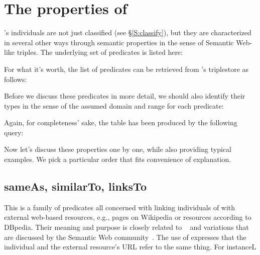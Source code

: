
\section{The properties of \solasote}
\label{S:properties}

\solasote's individuals are not just classified (see
\S\ref{S:classify}), but they are characterized in several other ways
through semantic properties in the sense of Semantic Web-like
triples. The underlying set of predicates is listed here:


\noindent
For what it's worth, the list of predicates can be retrieved from
\solasote's triplestore as follows:


\noindent
Before we discuss these predicates in more detail, we should also
identify their types in the sense of the assumed domain and range for
each predicate:


\noindent
Again, for completeness' sake, the table has been produced by the
following query:


\noindent
Now let's discuss these properties one by one, while also providing
typical examples. We pick a particular order that fits convenience of
explanation.


\subsection{sameAs, similarTo, linksTo} 

This is a family of predicates all concerned with linking individuals
of \solasote{} with external web-based resources, e.g., pages on
Wikipedia or resources according to DBpedia. Their meaning and purpose
is closely related to ~\cite{owl} and variations that
are discussed by the Semantic Web community~\cite{HalpinHT11}. The use
of  expresses that the \solasote{} individual and the
external resource's URL refer to the same thing. For instanceL


